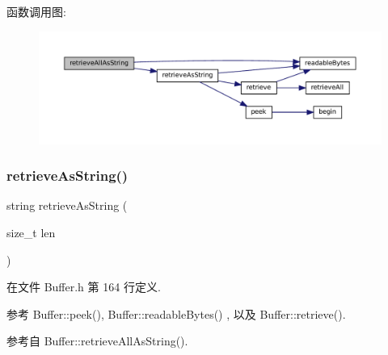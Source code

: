 函数调用图\+:
\nopagebreak
\begin{figure}[H]
\begin{center}
\leavevmode
\includegraphics[width=350pt]{classmuduo_1_1net_1_1Buffer_ac902667b575515cba5b54ddf3a5d10aa_cgraph}
\end{center}
\end{figure}
\mbox{\label{classmuduo_1_1net_1_1Buffer_a2f372acde2975d2cd9a7633148db7e7f}} 
\subsubsection{\texorpdfstring{retrieve\+As\+String()}{retrieveAsString()}}
{\footnotesize\ttfamily string retrieve\+As\+String (\begin{DoxyParamCaption}\item[{size\+\_\+t}]{len }\end{DoxyParamCaption})\hspace{0.3cm}{\ttfamily [inline]}}



在文件 Buffer.\+h 第 164 行定义.



参考 Buffer\+::peek(), Buffer\+::readable\+Bytes() , 以及 Buffer\+::retrieve().



参考自 Buffer\+::retrieve\+All\+As\+String().

